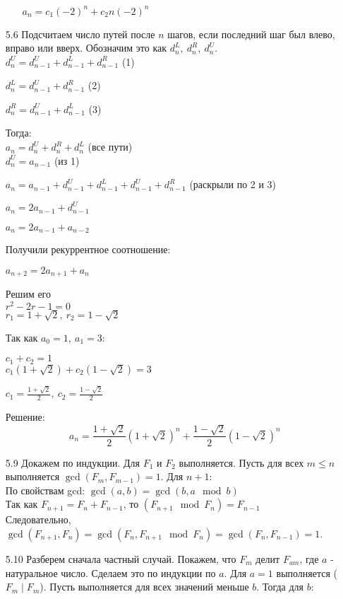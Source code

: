 \documentclass[10pt]{article}
\begin{document}
\begin{enumerate}
\begin{itemize}
		$a_n = c_1 (-2)^n + c_2 n (-2)^n$
	\end{itemize}
	
	\item[5.6] Подсчитаем число путей после $n$ шагов, если последний шаг был влево, вправо или вверх. Обозначим это как $d_n^{L},\ d_n^{R},\ d_n^{U}$.\\
	$d_n^U = d_{n-1}^U + d_{n-1}^L + d_{n-1}^R$ (1)
	
	$d_n^L = d_{n-1}^U + d_{n-1}^R$ (2) 
	
	$d_n^R = d_{n-1}^U + d_{n-1}^L$ (3)
	
	Тогда:\\
	$a_n = d_n^U + d_n^R + d_n^L$ (все пути)\\
	$d_n^U = a_{n-1}$ (из 1)
	
	$a_n = a_{n-1} + d_{n-1}^U + d_{n-1}^L + d_{n-1}^U + d_{n-1}^R$ (раскрыли по 2 и 3)
	
	$a_n = 2a_{n-1} + d_{n-1}^U$
	
	$a_n = 2a_{n-1} + a_{n-2}$
	
	Получили рекуррентное соотношение:
	
	$a_{n+2} = 2a_{n+1} + a_n$
	
	Решим его\\
	$r^2 - 2r - 1 = 0$\\
	$r_1 = 1+\sqrt{2},\ r_2 = 1 - \sqrt{2}$
	
	Так как $a_0 = 1,\ a_1 = 3$:
	
	$c_1 + c_2 = 1$\\
	$c_1 (1 + \sqrt{2}) + c_2 (1-\sqrt{2}) = 3$
	
	$c_1 = \frac{1+\sqrt{2}}{2},\ c_2 = \frac{1-\sqrt{2}}{2}$
	
	Решение:	
	$$a_n = \frac{1+\sqrt{2}}{2}(1+\sqrt{2})^n + \frac{1-\sqrt{2}}{2}(1 - \sqrt{2})^n$$
	
	\item[5.9] Докажем по индукции. Для $F_1$ и $F_2$ выполняется. Пусть для всех $m \le n$ выполняется $\gcd(F_m, F_{m-1}) = 1$. Для $n+1$:\\
	По свойствам gcd: $\gcd(a, b) = \gcd(b, a \mod b)$\\
	Так как $F_{n+1} = F_n + F_{n-1}$, то $(F_{n+1} \mod F_n) = F_{n-1}$\\
	Следовательно, $\gcd(F_{n+1}, F_n) = \gcd(F_n, F_{n+1} \mod F_n) = \gcd(F_n, F_{n-1}) = 1$.
	
	\item[5.10] Разберем сначала частный случай. Покажем, что $F_m$ делит $F_{am}$, где $a$ - натуральное число. Сделаем это по индукции по $a$. Для $a=1$ выполняется ($F_m \mid F_m$). Пусть выполняется для всех значений меньше $b$. Тогда для $b$:
	

\end{enumerate}
\end{document}
